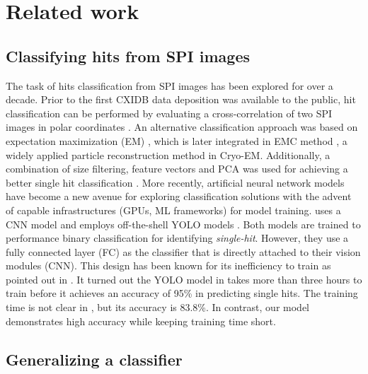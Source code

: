 \section{Related work}

\subsection{Classifying hits from SPI images}

The task of hits classification from SPI images has been explored for over a
decade. Prior to the first CXIDB data deposition
\cite{seibertSingleMimivirusParticles2011a} was available to the public, hit
classification can be performed by evaluating a cross-correlation of two SPI
images in polar coordinates \cite{bortelClassificationAveragingRandom2009}.  An
alternative classification approach was based on expectation maximization (EM)
\cite{dempsterMaximumLikelihoodIncomplete1977}, which is later integrated in EMC
method \cite{lohReconstructionAlgorithmSingleparticle2009}, a widely applied
particle reconstruction method in Cryo-EM.  Additionally, a combination of size
filtering, feature vectors and PCA was used for achieving a better single hit
classification \cite{bobkovSortingAlgorithmsSingleparticle2015}.  More recently,
artificial neural network models have become a new avenue for exploring
classification solutions with the advent of capable infrastructures (GPUs, ML
frameworks) for model training. \cite{shiEvaluationPerformanceClassification2019}
uses a CNN model  and \cite{ignatenkoClassificationDiffractionPatterns2021}
employs off-the-shell YOLO models \cite{redmonYOLO9000BetterFaster2016,
redmonYOLOv3IncrementalImprovement2018}.  Both models are trained to performance
binary classification for identifying \textit{single-hit}.  However, they use a
fully connected layer (FC) as the classifier that is directly attached to their
vision modules (CNN).  This design has been known for its inefficiency to train
as pointed out in \cite{schroffFaceNetUnifiedEmbedding2015}.  It turned out the
YOLO model in \cite{ignatenkoClassificationDiffractionPatterns2021} takes more
than three hours to train before it achieves an accuracy of 95\% in predicting
single hits.  The training time is not clear in
\cite{shiEvaluationPerformanceClassification2019}, but its accuracy is 83.8\%.
In contrast, our model demonstrates high accuracy while keeping training time
short.  


\subsection{Generalizing a classifier}

